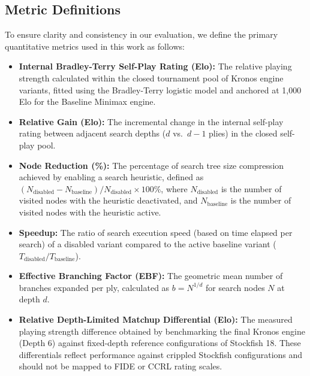 \subsection{Metric Definitions}
To ensure clarity and consistency in our evaluation, we define the primary quantitative metrics used in this work as follows:
\begin{itemize}
    \item \textbf{Internal Bradley-Terry Self-Play Rating (Elo):} The relative playing strength calculated within the closed tournament pool of Kronos engine variants, fitted using the Bradley-Terry logistic model and anchored at 1,000 Elo for the Baseline Minimax engine.
    \item \textbf{Relative Gain (Elo):} The incremental change in the internal self-play rating between adjacent search depths ($d$ vs.\ $d-1$ plies) in the closed self-play pool.
    \item \textbf{Node Reduction (\%):} The percentage of search tree size compression achieved by enabling a search heuristic, defined as $(N_{\text{disabled}} - N_{\text{baseline}}) / N_{\text{disabled}} \times 100\%$, where $N_{\text{disabled}}$ is the number of visited nodes with the heuristic deactivated, and $N_{\text{baseline}}$ is the number of visited nodes with the heuristic active.
    \item \textbf{Speedup:} The ratio of search execution speed (based on time elapsed per search) of a disabled variant compared to the active baseline variant ($T_{\text{disabled}} / T_{\text{baseline}}$).
    \item \textbf{Effective Branching Factor (EBF):} The geometric mean number of branches expanded per ply, calculated as $b = N^{1/d}$ for search nodes $N$ at depth $d$.
    \item \textbf{Relative Depth-Limited Matchup Differential (Elo):} The measured playing strength difference obtained by benchmarking the final Kronos engine (Depth 6) against fixed-depth reference configurations of Stockfish 18. These differentials reflect performance against crippled Stockfish configurations and should not be mapped to FIDE or CCRL rating scales.
\end{itemize}

